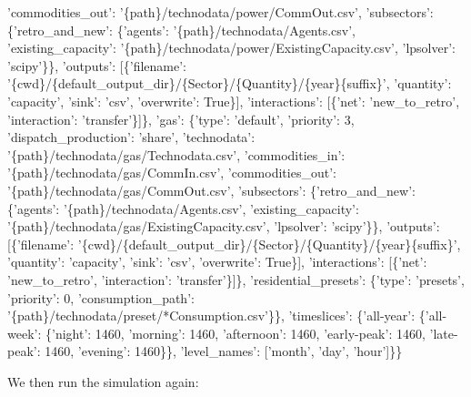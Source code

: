 \documentclass[letterpaper,10pt,english]{sphinxmanual}
\begin{document}
{\begin{sphinxVerbatim}[commandchars=\\\{\}]
   'commodities\_out': '\{path\}/technodata/power/CommOut.csv',
   'subsectors': \{'retro\_and\_new': \{'agents': '\{path\}/technodata/Agents.csv',
     'existing\_capacity': '\{path\}/technodata/power/ExistingCapacity.csv',
     'lpsolver': 'scipy'\}\},
   'outputs': [\{'filename': '\{cwd\}/\{default\_output\_dir\}/\{Sector\}/\{Quantity\}/\{year\}\{suffix\}',
     'quantity': 'capacity',
     'sink': 'csv',
     'overwrite': True\}],
   'interactions': [\{'net': 'new\_to\_retro', 'interaction': 'transfer'\}]\},
  'gas': \{'type': 'default',
   'priority': 3,
   'dispatch\_production': 'share',
   'technodata': '\{path\}/technodata/gas/Technodata.csv',
   'commodities\_in': '\{path\}/technodata/gas/CommIn.csv',
   'commodities\_out': '\{path\}/technodata/gas/CommOut.csv',
   'subsectors': \{'retro\_and\_new': \{'agents': '\{path\}/technodata/Agents.csv',
     'existing\_capacity': '\{path\}/technodata/gas/ExistingCapacity.csv',
     'lpsolver': 'scipy'\}\},
   'outputs': [\{'filename': '\{cwd\}/\{default\_output\_dir\}/\{Sector\}/\{Quantity\}/\{year\}\{suffix\}',
     'quantity': 'capacity',
     'sink': 'csv',
     'overwrite': True\}],
   'interactions': [\{'net': 'new\_to\_retro', 'interaction': 'transfer'\}]\},
  'residential\_presets': \{'type': 'presets',
   'priority': 0,
   'consumption\_path': '\{path\}/technodata/preset/*Consumption.csv'\}\},
 'timeslices': \{'all-year': \{'all-week': \{'night': 1460,
    'morning': 1460,
    'afternoon': 1460,
    'early-peak': 1460,
    'late-peak': 1460,
    'evening': 1460\}\},
  'level\_names': ['month', 'day', 'hour']\}\}
\end{sphinxVerbatim}
}

We then run the simulation again:

{
\begin{sphinxVerbatim}[commandchars=\\\{\}]
\llap{\color{nbsphinxin}[10]:\,\hspace{\fboxrule}\hspace{\fboxsep}}    
\end{sphinxVerbatim}
}
\end{document}
